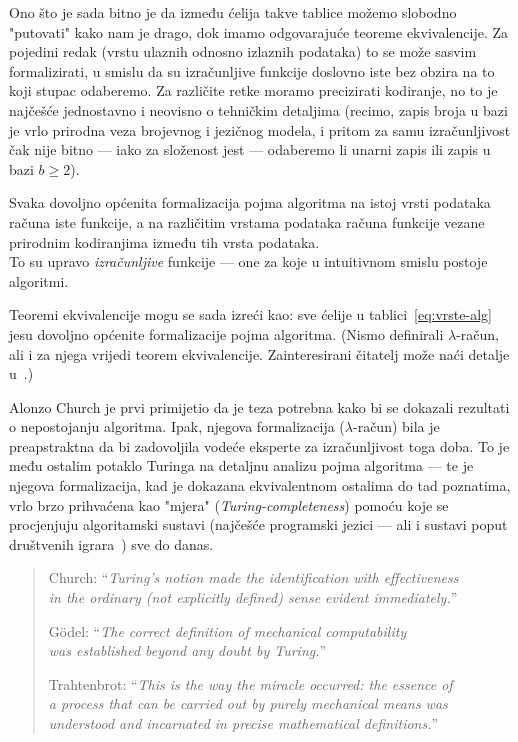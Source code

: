 Ono što je sada bitno je da između ćelija takve tablice možemo slobodno "putovati" kako nam je drago, dok imamo odgovarajuće teoreme ekvivalencije. Za pojedini redak (vrstu ulaznih odnosno izlaznih podataka) to se može sasvim formalizirati, u smislu da su izračunljive funkcije doslovno iste bez obzira na to koji stupac odaberemo. Za različite retke moramo precizirati kodiranje, no to je najčešće jednostavno i neovisno o tehničkim detaljima (recimo, zapis broja u bazi je vrlo prirodna veza brojevnog i jezičnog modela, i pritom za samu izračunljivost čak nije bitno --- iako za složenost jest --- odaberemo li unarni zapis ili zapis u bazi $b\ge2$).

\begin{ctteza}
Svaka dovoljno općenita formalizacija pojma algoritma na istoj vrsti podataka ra\-ču\-na iste funkcije, a na različitim vrstama podataka računa funkcije vezane prirodnim kodiranjima između tih vrsta podataka.\\ To su upravo \emph{izračunljive} funkcije --- one za koje u intuitivnom smislu postoje algoritmi.
\end{ctteza}

Teoremi ekvivalencije mogu se sada izreći kao: sve ćelije u tablici~\eqref{eq:vrste-alg} jesu dovoljno općenite formalizacije pojma algoritma. (Nismo definirali $\lambda$-račun, ali i za njega vrijedi teorem ekvivalencije. Zainteresirani čitatelj može naći detalje u~\cite{lovnicki}.)

Alonzo Church je prvi primijetio da je teza potrebna kako bi se dokazali rezultati o nepostojanju algoritma. Ipak, njegova formalizacija ($\lambda$-račun) bila je preapstraktna da bi zadovoljila vodeće eksperte za izračunljivost toga doba. To je među ostalim potaklo Turinga na detaljnu analizu pojma algoritma --- te je njegova formalizacija, kad je dokazana ekvivalentnom ostalima do tad poznatima, vrlo brzo prihvaćena kao "mjera" (\!\emph{Turing-completeness}) pomoću koje se procjenjuju algoritamski sustavi (najčešće programski jezici --- ali i sustavi poput društvenih igrara~\cite{magicTuring}) sve do danas.

\begin{quote}
    Church: ``\!\emph{Turing's notion made the identification with effectiveness \\ in the ordinary (not explicitly defined) sense evident immediately.}''
    
    G\"odel: ``\!\emph{The correct definition of mechanical computability\\ was established beyond any doubt by Turing.}''

    Trahtenbrot: ``\!\emph{This is the way the miracle occurred: the essence of\\ a process that can be carried out by purely mechanical means was\\ understood and incarnated in precise mathematical definitions.}''
\end{quote}

